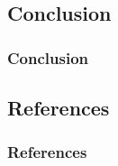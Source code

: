 \documentclass[10pt]{beamer}
\begin{document}
\begin{frame}
\section{Conclusion}
\frametitle{Conclusion}

\end{frame}
\begin{frame}
\section{References}
\frametitle{References}
\printbibliography
\end{frame}
\end{document}
